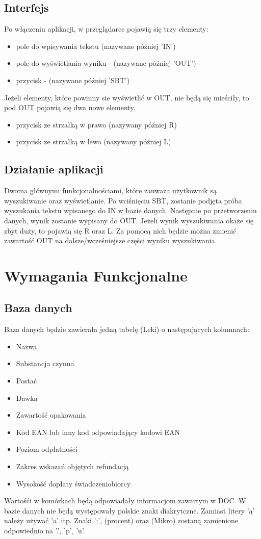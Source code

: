 \documentclass[10pt, a4paper]{article}
\begin{document}
\subsection{Interfejs}
Po włączeniu aplikacji, w przeglądarce pojawią się trzy elementy:\newline
\begin{itemize}
\item pole do wpisywania tekstu (nazywane później 'IN')
\item pole do wyświetlania wyniku - (nazywane później 'OUT') 
\item przycisk - (nazywane później 'SBT')
\end{itemize}
Jeżeli elementy, które powinny sie wyświetlić w OUT, nie będą się mieściły, to pod OUT pojawią się dwa nowe elementy. \newline
\begin{itemize}
\item przycisk ze strzałką w prawo (nazywany później R)
\item przycisk ze strzałką w lewo (nazywany później L)
\end{itemize}
\subsection{Działanie aplikacji}
Dwoma głównymi funkcjonalnościami, które zauważa użytkownik są wyszukiwanie oraz wyświetlanie. Po wciśnięciu SBT, zostanie podjęta próba wyszukania tekstu wpisanego do IN w bazie danych.
Następnie po przetworzeniu danych, wynik zostanie wypisany do OUT. Jeżeli wynik wyszukiwania okaże się zbyt duży, to pojawią się R oraz L.
Za pomocą nich będzie można zmienić zawartość OUT na dalsze/wcześniejsze części wyniku wyszukiwania.
\section{Wymagania Funkcjonalne}
\subsection{Baza danych}
Baza danych będzie zawierała jedną tabelę (Leki) o następujących kolumnach: \newline
\begin{itemize}
\item Nazwa
\item Substancja czynna
\item Postać
\item Dawka
\item Zawartość opakowania
\item Kod EAN lub inny kod odpowiadający kodowi EAN
\item Poziom odpłatności
\item Zakres wskazań objętych refundacją
\item Wysokość dopłaty świadczeniobiorcy
\end{itemize}
Wartośći w komórkach będą odpowiadały informacjom zawartym w DOC.\newline
W bazie danych nie będą występowały polskie znaki diakrytczne. Zamiast litery 'ą' należy używać 'a' itp. \newline
Znaki ';', (procent) oraz (Mikro) zostaną zamienione odpowiednio na '.', 'p', 'u'.
\end{document}
